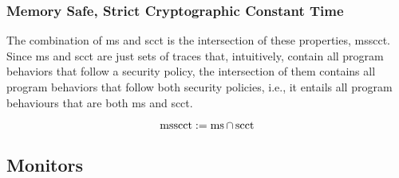 \documentclass[utf8,acmsmall,review,screen,dvipsnames,anonymous]{acmart}
\begin{document}
\subsubsection{Memory Safe, Strict Cryptographic Constant Time}

The combination of \gls{ms} and \gls{scct} is the intersection of these properties, \gls{msscct}.
Since \gls{ms} and \gls{scct} are just sets of traces that, intuitively, contain all program behaviors that follow a security policy, the intersection of them contains all program behaviors that follow both security policies, i.e., it entails all program behaviours that are both \gls{ms} and \gls{scct}.

\begin{definition}\label{def:trace:msscctdef}
  $$
  \operatorname{msscct}:=\operatorname{ms}\cap\operatorname{scct}
  $$
\end{definition}

\subsection{Monitors}\label{subsec:monitors}
\end{document}
